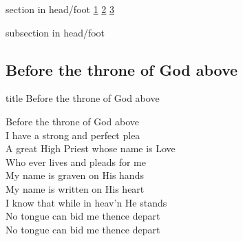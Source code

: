 \documentclass{beamer}
\begin{document}
{
{ 
 {
 \begin{beamercolorbox}[ht=4.5ex,dp=1.5ex,%
      leftskip=.3cm,rightskip=.3cm plus1fil]{section in head/foot}
 \fontsize{12}{25}\selectfont 
\hyperlink{Before the throne of God above[]1}{1}
\hyperlink{Before the throne of God above[]2}{2}
\hyperlink{Before the throne of God above[]3}{3}
 
 \end{beamercolorbox}%
  \begin{beamercolorbox}[ht=2.5ex,dp=1.125ex,%
   leftskip=.3cm,rightskip=.3cm plus1fil]{subsection in head/foot}
   \insertauthor
 \end{beamercolorbox}%
 }
}
\subsection{ Before the throne of God above }

\hypertarget{Before the throne of God above[]}{}
\begin{frame}{}
 \vfill
  \centering
  \begin{beamercolorbox}[sep=8pt,center,shadow=true,rounded=true]{title}
    Before the throne of God above    
  \end{beamercolorbox}
  \vfill
\end{frame}

\hypertarget{Before the throne of God above[]1}{}
\begin{frame}{}
\fontsize{ 15 }{ 19 }\selectfont

Before the throne of God above\\ 
I have a strong and perfect plea\\ 
A great High Priest whose name is Love\\ 
Who ever lives and pleads for me\\ 
My name is graven on His hands\\ 
My name is written on His heart\\ 
I know that while in heav'n He stands\\ 
No tongue can bid me thence depart\\ 
No tongue can bid me thence depart 

\end{frame}

\hypertarget{Before the throne of God above[]2}{}
\begin{frame}{}
\fontsize{ 15 }{ 19 }\selectfont


\end{frame}}
\end{document}
